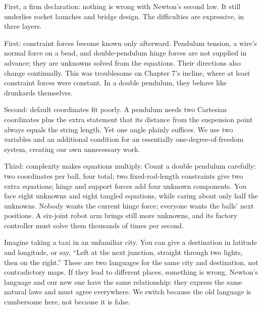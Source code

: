 \begin{mainline}
First, a firm declaration: nothing is wrong with Newton's second law. It still underlies rocket launches and bridge design. The difficulties are expressive, in three layers.

First: constraint forces become known only afterward. Pendulum tension, a wire's normal force on a bead, and double-pendulum hinge forces are not supplied in advance; they are unknowns solved from the equations. Their directions also change continually. This was troublesome on Chapter 7's incline, where at least constraint forces were constant. In a double pendulum, they behave like drunkards themselves.

Second: default coordinates fit poorly. A pendulum needs two Cartesian coordinates plus the extra statement that its distance from the suspension point always equals the string length. Yet one angle plainly suffices. We use two variables and an additional condition for an essentially one-degree-of-freedom system, creating our own unnecessary work.

Third: complexity makes equations multiply. Count a double pendulum carefully: two coordinates per ball, four total; two fixed-rod-length constraints give two extra equations; hinge and support forces add four unknown components. You face eight unknowns and eight tangled equations, while caring about only half the unknowns. Nobody wants the current hinge force; everyone wants the balls' next positions. A six-joint robot arm brings still more unknowns, and its factory controller must solve them thousands of times per second.

Imagine taking a taxi in an unfamiliar city. You can give a destination in latitude and longitude, or say, ``Left at the next junction, straight through two lights, then on the right.'' These are two languages for the same city and destination, not contradictory maps. If they lead to different places, something is wrong. Newton's language and our new one have the same relationship: they express the same natural laws and must agree everywhere. We switch because the old language is cumbersome here, not because it is false.
\end{mainline}


